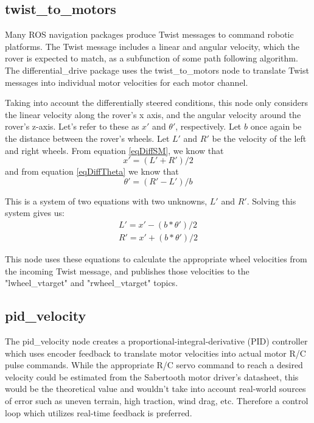 \subsection{twist\_to\_motors}
Many ROS navigation packages produce Twist messages to command robotic platforms. The Twist message includes a linear and angular velocity, which the rover is expected to match, as a subfunction of some path following algorithm. The differential\_drive package uses the twist\_to\_motors node to translate Twist messages into individual motor velocities for each motor channel. 

Taking into account the differentially steered conditions, this node only considers the linear velocity along the rover's x axis, and the angular velocity around the rover's z-axis. Let's refer to these as \(x'\) and \(\theta '\), respectively. Let \(b\) once again be the distance between the rover's wheels. Let \(L'\) and \(R'\) be the velocity of the left and right wheels. From equation \ref{eqDiffSM}, we know that
\begin{equation*}
x' = (L' + R') / 2
\end{equation*}
and from equation \ref{eqDiffTheta} we know that
\begin{equation*}
\theta ' = (R' - L') / b
\end{equation*}

This is a system of two equations with two unknowns, \(L'\) and \(R'\). Solving this system gives us: 
\begin{align*}
L' = x' - (b * \theta ') / 2 \\
R' = x' + (b * \theta ') / 2
\end{align*}

This node uses these equations to calculate the appropriate wheel velocities from the incoming Twist message, and publishes those velocities to the "lwheel\_vtarget" and "rwheel\_vtarget" topics. 

\subsection{pid\_velocity}
The pid\_velocity node creates a  proportional-integral-derivative (PID) controller which uses encoder feedback to translate motor velocities into actual motor R/C pulse commands. While the appropriate R/C servo command to reach a desired velocity could be estimated from the Sabertooth motor driver's datasheet, this would be the theoretical value and wouldn't take into account real-world sources of error such as uneven terrain, high traction, wind drag, etc. Therefore a control loop which utilizes real-time feedback is preferred.

